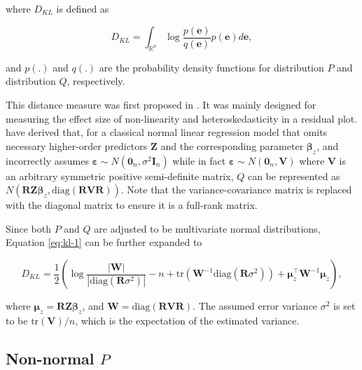 \documentclass[]{interact}
\theoremstyle{plain}%
\theoremstyle{definition}
\theoremstyle{remark}
\begin{document}
where \(D_{KL}\) is defined as

\begin{equation} \label{eq:kl-1}
D_{KL} = \int_{\mathbb{R}^{n}}\log\frac{p(\boldsymbol{e})}{q(\boldsymbol{e})}p(\boldsymbol{e})d\boldsymbol{e},
\end{equation}

\noindent and \(p(.)\) and \(q(.)\) are the probability density
functions for distribution \(P\) and distribution \(Q\), respectively.

This distance measure was first proposed in \citet{li2024plot}. It was
mainly designed for measuring the effect size of non-linearity and
heteroskedasticity in a residual plot. \citet{li2024plot} have derived
that, for a classical normal linear regression model that omits
necessary higher-order predictors \(\boldsymbol{Z}\) and the
corresponding parameter \(\boldsymbol{\beta}_z\), and incorrectly
assumes
\(\boldsymbol{\varepsilon} \sim N(\boldsymbol{0}_n,\sigma^2\boldsymbol{I}_n)\)
while in fact
\(\boldsymbol{\varepsilon} \sim N(\boldsymbol{0}_n, \boldsymbol{V})\)
where \(\boldsymbol{V}\) is an arbitrary symmetric positive
semi-definite matrix, \(Q\) can be represented as
\(N(\boldsymbol{R}\boldsymbol{Z}\boldsymbol{\beta}_z, \text{diag}(\boldsymbol{R}\boldsymbol{V}\boldsymbol{R}))\).
Note that the variance-covariance matrix is replaced with the diagonal
matrix to ensure it is a full-rank matrix.

Since both \(P\) and \(Q\) are adjusted to be multivariate normal
distributions, Equation \ref{eq:kl-1} can be further expanded to

\begin{equation} \label{eq:kl-2}
D_{KL} = \frac{1}{2}\left(\log\frac{|\boldsymbol{W}|}{|\text{diag}(\boldsymbol{R}\sigma^2)|} - n + \text{tr}(\boldsymbol{W}^{-1}\text{diag}(\boldsymbol{R}\sigma^2)) + \boldsymbol{\mu}_z^\top\boldsymbol{W}^{-1}\boldsymbol{\mu}_z\right),
\end{equation}

\noindent where
\(\boldsymbol{\mu}_z = \boldsymbol{R}\boldsymbol{Z}\boldsymbol{\beta}_z\),
and
\(\boldsymbol{W} = \text{diag}(\boldsymbol{R}\boldsymbol{V}\boldsymbol{R})\).
The assumed error variance \(\sigma^2\) is set to be
\(\text{tr}(\boldsymbol{V})/n\), which is the expectation of the
estimated variance.

\subsection{\texorpdfstring{Non-normal
\(P\)}{Non-normal P}}\label{non-normal-p}
\end{document}
